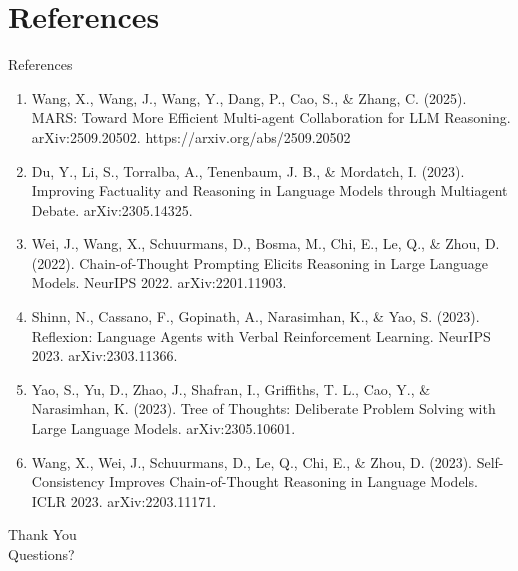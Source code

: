 \documentclass[10pt]{beamer}
\begin{document}
\section{References}
\begin{frame}[allowframebreaks]{References}
  \footnotesize
  \begin{enumerate}
    \item Wang, X., Wang, J., Wang, Y., Dang, P., Cao, S., \& Zhang, C. (2025). MARS: Toward More Efficient Multi-agent Collaboration for LLM Reasoning. arXiv:2509.20502. https://arxiv.org/abs/2509.20502
    \item Du, Y., Li, S., Torralba, A., Tenenbaum, J. B., \& Mordatch, I. (2023). Improving Factuality and Reasoning in Language Models through Multiagent Debate. arXiv:2305.14325.
    \item Wei, J., Wang, X., Schuurmans, D., Bosma, M., Chi, E., Le, Q., \& Zhou, D. (2022). Chain-of-Thought Prompting Elicits Reasoning in Large Language Models. NeurIPS 2022. arXiv:2201.11903.
    \item Shinn, N., Cassano, F., Gopinath, A., Narasimhan, K., \& Yao, S. (2023). Reflexion: Language Agents with Verbal Reinforcement Learning. NeurIPS 2023. arXiv:2303.11366.
    \item Yao, S., Yu, D., Zhao, J., Shafran, I., Griffiths, T. L., Cao, Y., \& Narasimhan, K. (2023). Tree of Thoughts: Deliberate Problem Solving with Large Language Models. arXiv:2305.10601.
    \item Wang, X., Wei, J., Schuurmans, D., Le, Q., Chi, E., \& Zhou, D. (2023). Self-Consistency Improves Chain-of-Thought Reasoning in Language Models. ICLR 2023. arXiv:2203.11171.
  \end{enumerate}
\end{frame}
\begin{frame}[plain]
  \begin{center}
    {\Huge Thank You}\\[1em]
    {\large Questions?}
  \end{center}
\end{frame}
\end{document}
